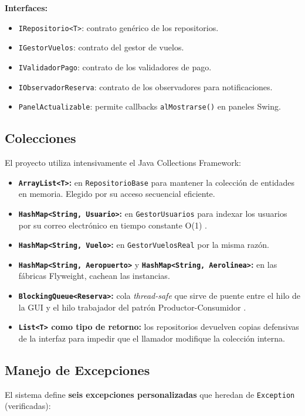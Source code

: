 \documentclass[12pt, letterpaper]{article}
\begin{document}
	\textbf{Interfaces:}
	\begin{itemize}
		\item \texttt{IRepositorio<T>}: contrato genérico de los repositorios.
		\item \texttt{IGestorVuelos}: contrato del gestor de vuelos.
		\item \texttt{IValidadorPago}: contrato de los validadores de pago.
		\item \texttt{IObservadorReserva}: contrato de los observadores para notificaciones.
		\item \texttt{PanelActualizable}: permite callbacks \texttt{alMostrarse()} en paneles Swing.
	\end{itemize}
	
	\subsection{Colecciones}
	El proyecto utiliza intensivamente el Java Collections Framework:
	
	\begin{itemize}
		\item \textbf{\texttt{ArrayList<T>}:} en \texttt{RepositorioBase} para mantener la colección de entidades en memoria. Elegido por su acceso secuencial eficiente.
		\item \textbf{\texttt{HashMap<String, Usuario>}:} en \texttt{GestorUsuarios} para indexar los usuarios por su correo electrónico en tiempo constante O(1) \cite{oracle_hashmap}.
		\item \textbf{\texttt{HashMap<String, Vuelo>}:} en \texttt{GestorVuelosReal} por la misma razón.
		\item \textbf{\texttt{HashMap<String, Aeropuerto>}} y \textbf{\texttt{HashMap<String, Aerolinea>}:} en las fábricas Flyweight, cachean las instancias.
		\item \textbf{\texttt{BlockingQueue<Reserva>}:} cola \textit{thread-safe} que sirve de puente entre el hilo de la GUI y el hilo trabajador del patrón Productor-Consumidor \cite{oracle_blockingqueue}.
		\item \textbf{\texttt{List<T>} como tipo de retorno:} los repositorios devuelven copias defensivas de la interfaz para impedir que el llamador modifique la colección interna.
	\end{itemize}
	
	\subsection{Manejo de Excepciones}
	El sistema define \textbf{seis excepciones personalizadas} que heredan de \texttt{Exception} (verificadas):
	
\end{document}
